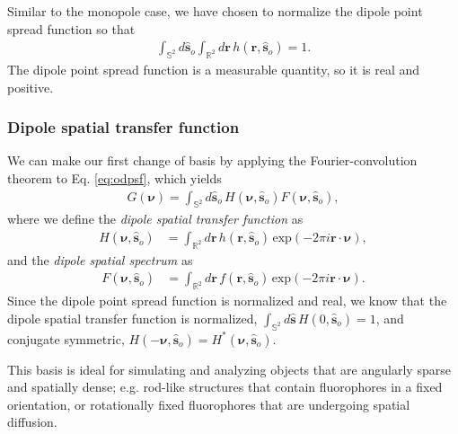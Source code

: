 \documentclass[]{osa-article}
\providecommand{\mb}[1]{\mathbf{#1}}
\providecommand{\so}{\mathbf{\hat{s}}_o}
\providecommand{\mh}[1]{\mathbf{\hat{#1}}}
\providecommand{\mbb}[1]{\mathbb{#1}}
\providecommand{\bs}[1]{\boldsymbol{#1}}
\providecommand{\bv}{\bs{\nu}}
\begin{document}
Similar to the monopole case, we have chosen to normalize the dipole point
spread function so that
\begin{align}
  \int_{\mbb{S}^2}d\so\int_{\mbb{R}^2}d\mb{r}\, h(\mb{r}, \so) = 1. 
\end{align}
The dipole point spread function is a measurable quantity, so it is real
and positive.

\subsubsection{Dipole spatial transfer function}
We can make our first change of basis by applying the Fourier-convolution
theorem to Eq. \eqref{eq:odpsf}, which yields
\begin{align}
G(\bv) = \int_{\mbb{S}^2}d\so\, H(\bv, \so)F(\bv, \so) \label{eq:odotf},
\end{align}
where we define the \textit{dipole spatial transfer function} as
  \begin{align}
  H(\bv, \so) &= \int_{\mbb{R}^2}d\mb{r}\, h(\mb{r}, \so)\, \text{exp}(-2\pi i\mb{r}\cdot\bv),\label{eq:dstf}
  \end{align}
  and the \textit{dipole spatial spectrum} as
  \begin{align}
  F(\bv, \so) &= \int_{\mbb{R}^2}d\mb{r}\, f(\mb{r}, \so)\, \text{exp}(-2\pi i\mb{r}\cdot\bv). 
  \end{align}
  Since the dipole point spread function is normalized and real, we know that
  the dipole spatial transfer function is normalized,
  $\int_{\mbb{S}^2}d\mh{s}\, H(0, \so) = 1$, and conjugate symmetric,
  $H(-\bv, \so) = H^*(\bv, \so)$.
  
  This basis is ideal for simulating and analyzing objects that are angularly
  sparse and spatially dense; e.g. rod-like structures that contain fluorophores
  in a fixed orientation, or rotationally fixed fluorophores that are undergoing
  spatial diffusion.
\end{document}
